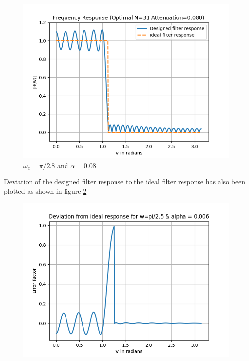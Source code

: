 \documentclass[conference]{IEEEtran}
\begin{document}
\begin{enumerate}[label=(\alph*)]
\begin{figure}[!h]
	\begin{center} 
	    \includegraphics[width=0.7\columnwidth]{figs/C/w2_a2}
	\end{center}
\caption{$\omega_c=\pi/2.8$ and $\alpha = 0.08$}
\label{fig:Fig13}
\end{figure}
\newpage
Deviation of the designed filter response to the ideal filter response has also been plotted as shown in figure \ref{fig:dev3}
\begin{figure}[!h]
	\begin{center} 
	    \includegraphics[width=0.7\columnwidth]{figs/dev/dev3}
	\end{center}
\caption{}
\label{fig:dev3}
\end{figure}

\end{enumerate}
\newpage
\end{document}
